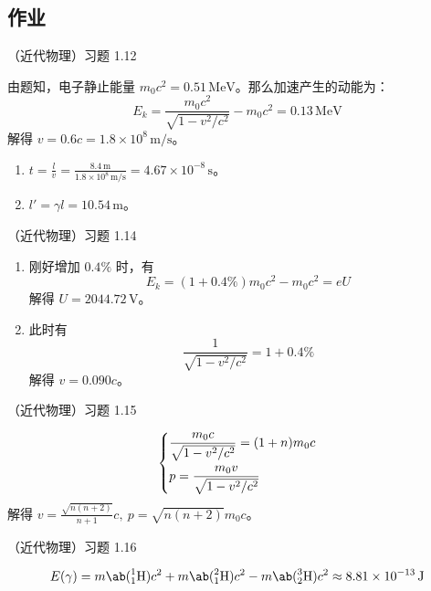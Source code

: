 \subsection{作业}

\begin{problem}
	（近代物理）习题 1.12
	\begin{solution}
		由题知，电子静止能量 $m_0 c^2 = 0.51\,\mathrm{MeV}$。那么加速产生的动能为：
		$$
		E_k = \frac{m_0 c^2}{\sqrt{1 - v^2 / c^2}} - m_0 c^2 = 0.13\,\mathrm{MeV}
		$$
		解得 $v = 0.6c = 1.8 \times 10^{8} \,\mathrm{m / s}$。

		\begin{enumerate}
			\item[\textbf{1)}] $t = \frac{l}{v} = \frac{8.4\,\mathrm{m}}{1.8 \times 10^{8}\,\mathrm{m / s}} = 4.67 \times 10^{-8}\,\mathrm{s}$。
			\item[\textbf{2)}] $l' = \gamma l = 10.54\,\mathrm{m}$。
		\end{enumerate}
	\end{solution}
\end{problem}

\begin{problem}
	（近代物理）习题 1.14
	\begin{solution}
		\begin{enumerate}
			\item[\textbf{1)}] 刚好增加 $0.4\%$ 时，有
			$$
			E_k = (1 + 0.4\%) m_0 c^2 - m_0 c^2 = e U
			$$
			解得 $U = 2044.72 \,\mathrm{V}$。

			\item[\textbf{2)}] 此时有
			$$
			\frac{1}{\sqrt{1 - v^2 / c^2}} = 1 + 0.4\%
			$$
			解得 $v = 0.090 c$。
		\end{enumerate}
	\end{solution}
\end{problem}

\begin{problem}
	（近代物理）习题 1.15
	\begin{solution}
		$$
		\begin{dcases}
			\frac{m_0 c}{\sqrt{1 - v^2 / c^2}} = (1 + n) m_0 c \\
			p = \frac{m_0 v}{\sqrt{1 - v^2 / c^2}}
		\end{dcases}
		$$
		解得 $v = \frac{\sqrt{n (n + 2)}}{n + 1} c,\ p = \sqrt{n (n + 2)} m_0 c$。
	\end{solution}
\end{problem}

\begin{problem}
	（近代物理）习题 1.16
	\begin{solution}
		$$
		E(\gamma) = m\ab(\prescript{1}{1}{\mathrm{H}}) c^2 + m\ab(\prescript{2}{1}{\mathrm{H}}) c^2 - m\ab(\prescript{3}{2}{\mathrm{H}}) c^2 \approx 8.81 \times 10^{-13}\,\mathrm{J}
		$$
	\end{solution}
\end{problem}

